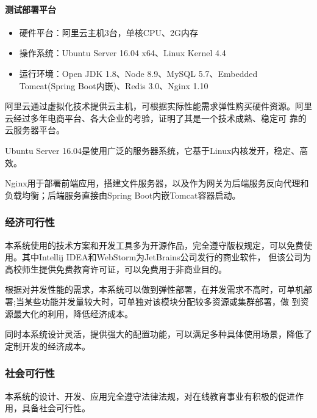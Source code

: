 \documentclass[titlepage,UTF8,linespread=1.5]{ctexart}
\begin{document}
\paragraph{测试部署平台}
\begin{itemize}
    \item 硬件平台：阿里云主机3台，单核CPU、2G内存
    \item 操作系统：Ubuntu Server 16.04 x64、Linux Kernel 4.4
    \item 运行环境：Open JDK 1.8、Node 8.9、MySQL 5.7、Embedded Tomcat(Spring Boot内嵌)、Redis 3.0、Nginx 1.10
\end{itemize}\par
阿里云通过虚拟化技术提供云主机，可根据实际性能需求弹性购买硬件资源。阿里云经过多年电商平台、各大企业的考验，证明了其是一个技术成熟、稳定可
靠的云服务器平台。\par
Ubuntu Server 16.04是使用广泛的服务器系统，它基于Linux内核发开，稳定、高效。\par
Nginx用于部署前端应用，搭建文件服务器，以及作为网关为后端服务反向代理和负载均衡；后端服务直接由Spring Boot内嵌Tomcat容器启动。\par

\subsubsection{经济可行性}
本系统使用的技术方案和开发工具多为开源作品，完全遵守版权规定，可以免费使 用。其中Intellij IDEA和WebStorm为JetBrains公司发行的商业软件，
但该公司为高校师生提供免费教育许可证，可以免费用于非商业目的。\par
根据对并发性能的需求，本系统可以做到弹性部署，在并发需求不高时，可单机部署;当某些功能并发量较大时，可单独对该模块分配较多资源或集群部署，做
到资源最大化的利用，降低经济成本。\par
同时本系统设计灵活，提供强大的配置功能，可以满足多种具体使用场景，降低了定制开发的经济成本。\par
\subsubsection{社会可行性}
本系统的设计、开发、应用完全遵守法律法规，对在线教育事业有积极的促进作用，具备社会可行性。\par

\clearpage
\end{document}
